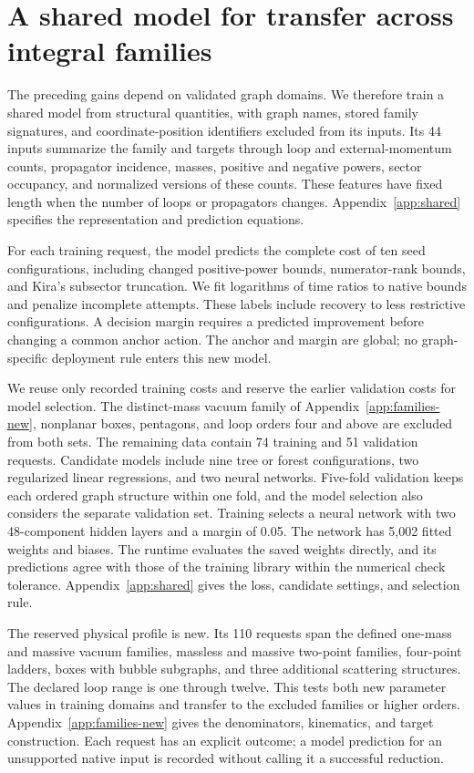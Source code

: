 \documentclass[11pt,a4paper]{article}
\begin{document}
\section{A shared model for transfer across integral families}
\label{sec:shared}
The preceding gains depend on validated graph domains. We therefore train a shared model from structural quantities, with graph names, stored family signatures, and coordinate-position identifiers excluded from its inputs. Its 44 inputs summarize the family and targets through loop and external-momentum counts, propagator incidence, masses, positive and negative powers, sector occupancy, and normalized versions of these counts. These features have fixed length when the number of loops or propagators changes. Appendix~\ref{app:shared} specifies the representation and prediction equations.

For each training request, the model predicts the complete cost of ten seed configurations, including changed positive-power bounds, numerator-rank bounds, and Kira's subsector truncation. We fit logarithms of time ratios to native bounds and penalize incomplete attempts. These labels include recovery to less restrictive configurations. A decision margin requires a predicted improvement before changing a common anchor action. The anchor and margin are global; no graph-specific deployment rule enters this new model.

We reuse only recorded training costs and reserve the earlier validation costs for model selection. The distinct-mass vacuum family of Appendix~\ref{app:families-new}, nonplanar boxes, pentagons, and loop orders four and above are excluded from both sets. The remaining data contain 74 training and 51 validation requests. Candidate models include nine tree or forest configurations, two regularized linear regressions, and two neural networks. Five-fold validation keeps each ordered graph structure within one fold, and the model selection also considers the separate validation set. Training selects a neural network with two 48-component hidden layers and a margin of 0.05. The network has 5,002 fitted weights and biases. The runtime evaluates the saved weights directly, and its predictions agree with those of the training library within the numerical check tolerance. Appendix~\ref{app:shared} gives the loss, candidate settings, and selection rule.

The reserved physical profile is new. Its 110 requests span the defined one-mass and massive vacuum families, massless and massive two-point families, four-point ladders, boxes with bubble subgraphs, and three additional scattering structures. The declared loop range is one through twelve. This tests both new parameter values in training domains and transfer to the excluded families or higher orders. Appendix~\ref{app:families-new} gives the denominators, kinematics, and target construction. Each request has an explicit outcome; a model prediction for an unsupported native input is recorded without calling it a successful reduction.

\end{document}
